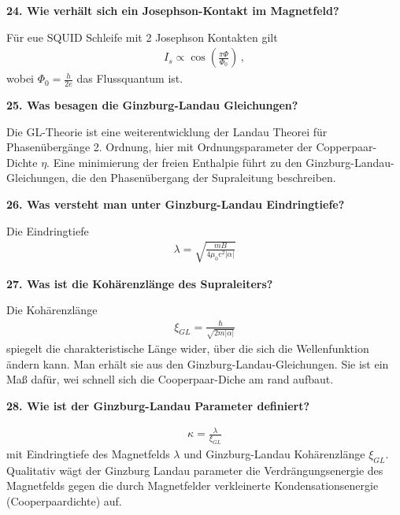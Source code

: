 \noindent\textbf{24. Wie verhält sich ein Josephson-Kontakt im Magnetfeld?}\\
\begin{addmargin}[25pt]{0pt}
Für eue SQUID Schleife mit 2 Josephson Kontakten gilt
\begin{align}
    I_s \propto \cos\left(\frac{\pi \Phi}{\Phi_0}\right)\,,
\end{align}
wobei $\Phi_0 = \frac{h}{2e}$ das Flussquantum ist.\\
\end{addmargin}

\noindent\textbf{25. Was besagen die Ginzburg-Landau Gleichungen?}\\
\begin{addmargin}[25pt]{0pt}
Die GL-Theorie ist eine weiterentwicklung der Landau Theorei für Phasenübergänge 2. Ordnung, hier mit Ordnungsparameter der Copperpaar-Dichte $\eta$. Eine minimierung der freien Enthalpie führt zu den Ginzburg-Landau-Gleichungen, die den Phasenübergang der Supraleitung beschreiben.\\
\end{addmargin}

\noindent\textbf{26. Was versteht man unter Ginzburg-Landau Eindringtiefe?}\\
\begin{addmargin}[25pt]{0pt}
Die Eindringtiefe
\begin{align}
    \lambda = \sqrt{\frac{mB}{4\mu_0 e^2\lvert\alpha\rvert}}
\end{align}
\end{addmargin}

\noindent\textbf{27. Was ist die Kohärenzlänge des Supraleiters?}\\
\begin{addmargin}[25pt]{0pt}
Die Kohärenzlänge 
\begin{align}
   \xi_{GL} = \frac{\hbar}{\sqrt{2m \lvert \alpha \rvert}}
\end{align}
spiegelt die charakteristische Länge wider, über die sich die
Wellenfunktion ändern kann. Man erhält sie aus den Ginzburg-Landau-Gleichungen. Sie ist ein Maß dafür, wei schnell sich die Cooperpaar-Diche am rand aufbaut.\\
\end{addmargin}
\noindent\textbf{28. Wie ist der Ginzburg-Landau Parameter definiert?}\\
\begin{addmargin}[25pt]{0pt}
\begin{align}
    \kappa = \frac{\lambda}{\xi_{GL}}
\end{align}
mit Eindringtiefe des Magnetfelds $\lambda$ und Ginzburg-Landau Kohärenzlänge $\xi_{GL}$.
Qualitativ wägt der Ginzburg Landau parameter die Verdrängungsenergie des Magnetfelds gegen die durch Magnetfelder verkleinerte Kondensationsenergie (Cooperpaardichte) auf.\\
\end{addmargin}

